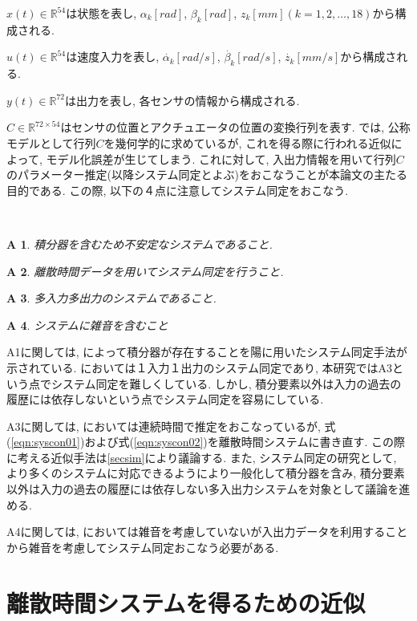 \documentclass[a4paper,12pt]{jbook}
\begin{document}
$x(t) \in \mathbb{R}^{54}$は状態を表し, $α_k [rad]$, $β_k [rad]$, $z_k [mm] (k=1, 2, \dots , 18)$から構成される.

$u(t) \in \mathbb{R}^{54}$は速度入力を表し, $\dot{α_k} [rad/s]$, $\dot{β_k} [rad/s]$, $\dot{z_k} [mm/s]$から構成される.

$y(t) \in \mathbb{R}^{72}$は出力を表し, 各センサの情報から構成される.

$C \in \mathbb{R}^{72\times54}$はセンサの位置とアクチュエータの位置の変換行列を表す.
\newpage
\cite{tele_a}では, 公称モデルとして行列$C$を幾何学的に求めているが, これを得る際に行われる近似によって, モデル化誤差が生じてしまう. これに対して, 入出力情報を用いて行列$C$のパラメーター推定(以降システム同定とよぶ)をおこなうことが本論文の主たる目的である. この際, 以下の４点に注意してシステム同定をおこなう.
\newtheorem{A}{A}　
\begin{A}
積分器を含むため不安定なシステムであること.
\end{A}

\begin{A}
離散時間データを用いてシステム同定を行うこと.
\end{A}

\begin{A}
多入力多出力のシステムであること.
\end{A}

\begin{A}
システムに雑音を含むこと
\end{A}

A1に関しては, \cite{sysiden_a}によって積分器が存在することを陽に用いたシステム同定手法が示されている. \cite{sysiden_a}においては１入力１出力のシステム同定であり, 本研究ではA3という点でシステム同定を難しくしている. しかし, 積分要素以外は入力の過去の履歴には依存しないという点でシステム同定を容易にしている.

A3に関しては, \cite{tele_a}においては連続時間で推定をおこなっているが, 式(\ref{eqn:syscon01})および式(\ref{eqn:syscon02})を離散時間システムに書き直す. この際に考える近似手法は\ref{secsim}により議論する. また, システム同定の研究として, より多くのシステムに対応できるようにより一般化して積分器を含み, 積分要素以外は入力の過去の履歴には依存しない多入出力システムを対象として議論を進める. 

A4に関しては, \cite{tele_a}においては雑音を考慮していないが入出力データを利用することから雑音を考慮してシステム同定おこなう必要がある.

\section{離散時間システムを得るための近似} \label{sec:sim}
\end{document}
